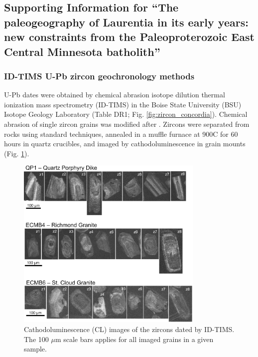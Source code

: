 \documentclass[11pt,letterpaper]{article}
\begin{document}
\renewcommand{\thefigure}{SI\arabic{figure}}

\subsection*{Supporting Information for ``The paleogeography of Laurentia in its early years: new constraints from the Paleoproterozoic East Central Minnesota batholith''}

\subsubsection*{ID-TIMS U-Pb zircon geochronology methods}

U-Pb dates were obtained by chemical abrasion isotope dilution thermal ionization mass spectrometry (ID-TIMS) in the Boise State University (BSU) Isotope Geology Laboratory (Table DR1; Fig. \ref{fig:zircon_concordia}). Chemical abrasion of single zircon grains was modified after \cite{Mattinson2005a}. Zircons were separated from rocks using standard techniques, annealed in a muffle furnace at 900\textdegree C for 60 hours in quartz crucibles, and imaged by cathodoluminescence in grain mounts (Fig. \ref{fig:zircon_CL}). 

\begin{figure}[!ht]
\noindent\includegraphics[width=0.8\textwidth]{./figures/SI_zircon_CLimages.png}
\centering
\caption{\small{Cathodoluminescence (CL) images of the zircons dated by ID-TIMS. The 100 $\mu$m scale bars applies for all imaged grains in a given sample.}}
\label{fig:zircon_CL}
\end{figure}
\end{document}
